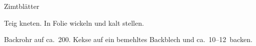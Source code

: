 \begin{recipe}[\vegetarian]{Zimtblätter}

    \begin{ingredients}
    \end{ingredients}

    \begin{instructions}
        Teig kneten.
        In Folie wickeln und kalt stellen.

        Backrohr auf ca.\ 200\degC.
        Kekse auf ein bemehltes Backblech und ca.\ 10--12\minutes\ backen.
    \end{instructions}
\end{recipe}
